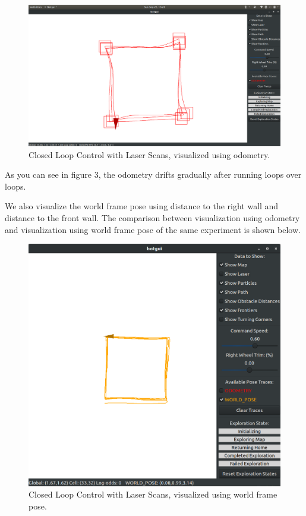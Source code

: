 \documentclass[conference]{IEEEtran}
\begin{document}
\begin{figure}[H]
\centering
\includegraphics[width=\linewidth]{lidar_odometry_square.png}
\caption{Closed Loop Control with Laser Scans, visualized using odometry.}
\label{fig:task6}
\end{figure}
As you can see in figure 3, the odometry drifts gradually after running loops over loops.

We also visualize the world frame pose using distance to the right wall and distance to the front wall. The comparison between visualization using odometry and visualization using world frame pose of the same experiment is shown below.

\begin{figure}[H]
\centering
\includegraphics[width=\linewidth]{lidar_wf_pose.png}
\caption{Closed Loop Control with Laser Scans, visualized using world frame pose.}
\label{fig:task6}
\end{figure}
\end{document}
